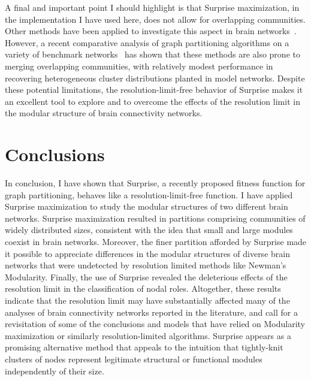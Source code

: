 A final and important point I should highlight is that Surprise maximization, in the implementation I have used here, does not allow for overlapping communities. Other methods have been applied to investigate this aspect in brain networks~\cite{palla2005,ahn2010}. However, a recent comparative analysis of graph partitioning algorithms on a variety of benchmark networks~\cite{lancichinetti2009} has shown that these methods are also prone to merging overlapping communities, with relatively modest performance in recovering heterogeneous cluster distributions planted in model networks.
Despite these potential limitations, the resolution-limit-free behavior of Surprise makes it an excellent tool to explore and to overcome the effects of the resolution limit in the modular structure of brain connectivity networks.


\section{Conclusions}
In conclusion, I have shown that Surprise, a recently proposed fitness function for graph partitioning, behaves like a resolution-limit-free function.
I have applied Surprise maximization to study the modular structures of two different brain networks.
Surprise maximization resulted in partitions comprising communities of widely distributed sizes, consistent with the idea that small and large modules coexist in brain networks.
Moreover, the finer partition afforded by Surprise made it possible to appreciate differences in the modular structures of diverse brain networks that were undetected by resolution limited methods like Newman's Modularity.
Finally, the use of Surprise revealed the deleterious effects of the resolution limit in the classification of nodal roles.
Altogether, these results indicate that the resolution limit may have substantially affected many of the analyses of brain connectivity networks reported in the literature, and call for a revisitation of some of the conclusions and models that have relied on Modularity maximization or similarly resolution-limited algorithms.
Surprise appears as a promising alternative method that appeals to the intuition that tightly-knit clusters of nodes represent legitimate structural
or functional modules independently of their size.